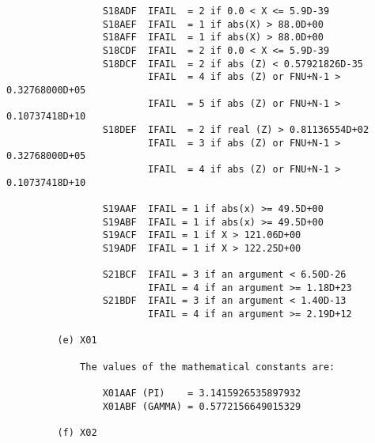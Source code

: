 \begin{small}
\begin{verbatim}
                 S18ADF  IFAIL  = 2 if 0.0 < X <= 5.9D-39                       
                 S18AEF  IFAIL  = 1 if abs(X) > 88.0D+00                        
                 S18AFF  IFAIL  = 1 if abs(X) > 88.0D+00                        
                 S18CDF  IFAIL  = 2 if 0.0 < X <= 5.9D-39                       
                 S18DCF  IFAIL  = 2 if abs (Z) < 0.57921826D-35                 
                         IFAIL  = 4 if abs (Z) or FNU+N-1 > 0.32768000D+05      
                         IFAIL  = 5 if abs (Z) or FNU+N-1 > 0.10737418D+10      
                 S18DEF  IFAIL  = 2 if real (Z) > 0.81136554D+02                
                         IFAIL  = 3 if abs (Z) or FNU+N-1 > 0.32768000D+05      
                         IFAIL  = 4 if abs (Z) or FNU+N-1 > 0.10737418D+10      
                                                                                
                 S19AAF  IFAIL = 1 if abs(x) >= 49.5D+00                        
                 S19ABF  IFAIL = 1 if abs(x) >= 49.5D+00                        
                 S19ACF  IFAIL = 1 if X > 121.06D+00                            
                 S19ADF  IFAIL = 1 if X > 122.25D+00                            
                                                                                
                 S21BCF  IFAIL = 3 if an argument < 6.50D-26                    
                         IFAIL = 4 if an argument >= 1.18D+23                   
                 S21BDF  IFAIL = 3 if an argument < 1.40D-13                    
                         IFAIL = 4 if an argument >= 2.19D+12                   
                                                                                
         (e) X01                                                                
                                                                                
             The values of the mathematical constants are:                      
                                                                                
                 X01AAF (PI)    = 3.1415926535897932                            
                 X01ABF (GAMMA) = 0.5772156649015329                            
                                                                                
         (f) X02                                                                
                                                                                

\end{verbatim}
\end{small}
